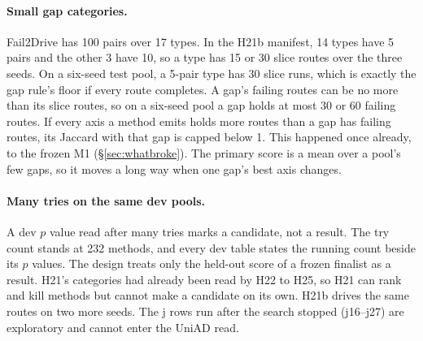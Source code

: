 \paragraph{Small gap categories.}
Fail2Drive has 100 pairs over 17 types. In the H21b manifest, 14 types have 5
pairs and the other 3 have 10, so a type has 15 or 30 slice routes over the
three seeds. On a six-seed test pool, a 5-pair type has 30 slice runs, which is
exactly the gap rule's floor if every route completes. A gap's failing routes
can be no more than its slice routes, so on a six-seed pool a gap holds at most
30 or 60 failing routes.
If every axis a method emits holds more routes than a gap has failing routes,
its Jaccard with that gap is capped below 1. This happened once already, to the frozen M1 (\S\ref{sec:whatbroke}). The
primary score is a mean over a pool's few gaps, so it moves a long way when one
gap's best axis changes.

\paragraph{Many tries on the same dev pools.}
A dev $p$ value read after many tries marks a candidate, not a result. The try
count stands at 232 methods, and every dev table states the running count
beside its $p$ values. The design treats only the held-out score of a frozen
finalist as a result.
H21's categories had already been read by H22 to H25, so H21 can rank and
kill methods but cannot make a candidate on its own. H21b drives the same
routes on two more seeds. The j rows run
after the search stopped (j16--j27) are exploratory and cannot enter the UniAD
read.

